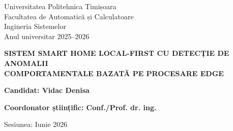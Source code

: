 \documentclass[12pt, twoside, a4paper]{report}
\begin{document}


\begin{titlepage}
\thispagestyle{empty}

\begin{center}

\vspace*{0.3cm}
{\fontsize{11}{13}\selectfont Universitatea Politehnica Timișoara}\\[2pt]
{\fontsize{11}{13}\selectfont Facultatea de Automatică și Calculatoare}\\[2pt]
{\fontsize{11}{13}\selectfont Ingineria Sistemelor}\\[2pt]
{\fontsize{11}{13}\selectfont Anul universitar 2025--2026}

\vfill

{\fontsize{20}{24}\bfseries\MakeUppercase{Sistem Smart Home Local-First
cu Detecție de Anomalii \\ Comportamentale bazată pe Procesare Edge}\par}

\vfill

\end{center}

\begin{flushleft}
{\fontsize{14}{17}\bfseries Candidat: Vidac Denisa\par}
\vspace{6pt}
{\fontsize{14}{17}\bfseries Coordonator științific: Conf./Prof. dr. ing.
\underline{\hspace{6cm}}\par}
\end{flushleft}

\vspace{2cm}

\begin{center}
{\fontsize{14}{17}\selectfont Sesiunea: Iunie 2026}
\end{center}

\end{titlepage}


\newpage
\thispagestyle{empty}
\vspace*{1cm}
\end{document}
